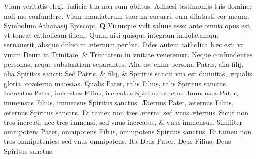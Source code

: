 \documentclass[a5paper,10pt]{book}
\def\ae{æ}
\def\AE{Æ}
\begin{document}
\begin{multicols*}{2}
\newline \color{red} V\color{black}iam veritatis elegi: iudicia tua non sum oblitus.
\newline \color{red} A\color{black}dh\ae si testimonijs tuis domine: noli me confundere.
\newline \color{red} V\color{black}iam mandatorum tuorum cucurri, cum dilatasti cor meum.
\newline \color{red} Symbolum Athanasij Episcopi. \color{black}
\vspace{-1em}
\lettrine[lines=2]{\bfseries \color{red} Q}{}
Vicunque vult saluus esse: ante omnia opus est, vt teneat catholicam fidem.
\newline \color{red} Q\color{black}uam nisi quisque integram inuiolatamque seruauerit, absque dubio in \ae ternum peribit.
\newline \color{red} F\color{black}ides autem catholica h\ae c est: vt vnum Deum in Trinitate, \& Trinitatem in vnitate veneremur.
\newline \color{red} N\color{black}eque confundentes personas, neque substantiam separantes.
\newline \color{red} A\color{black}lia est enim persona Patris, alia filij, alia Spiritus sancti:
\newline \color{red} S\color{black}ed Patris, \& filij, \& Spiritus sancti vna est diuinitas, \ae qualis gloria, co\ae terna maiestas.
\newline \color{red} Q\color{black}ualis Pater, talis Filius, talis Spiritus sanctus.
\newline \color{red} I\color{black}ncreatus Pater, increatus Filius, increatus Spiritus sanctus.
\newline \color{red} I\color{black}mmensus Pater, immensus Filius, immensus Spiritus sanctus.
\newline \color{red} \AE \color{black}ternus Pater, \ae ternus Filius, \ae ternus Spiritus sanctus.
\newline \color{red} E\color{black}t tamen non tres \ae terni: sed vnus \ae ternus.
\newline \color{red} S\color{black}icut non tres increati, nec tres immensi, sed vnus increatus, \& vnus immensus.
\newline \color{red} S\color{black}imiliter omnipotens Pater, omnipotens Filius, omnipotens Spiritus sanctus.
\newline \color{red} E\color{black}t tamen non tres omnipotentes: sed vnus omnipotens.
\newline \color{red} I\color{black}ta Deus Pater, Deus Filius, Deus Spiritus sanctus.

\end{multicols*}
\end{document}
